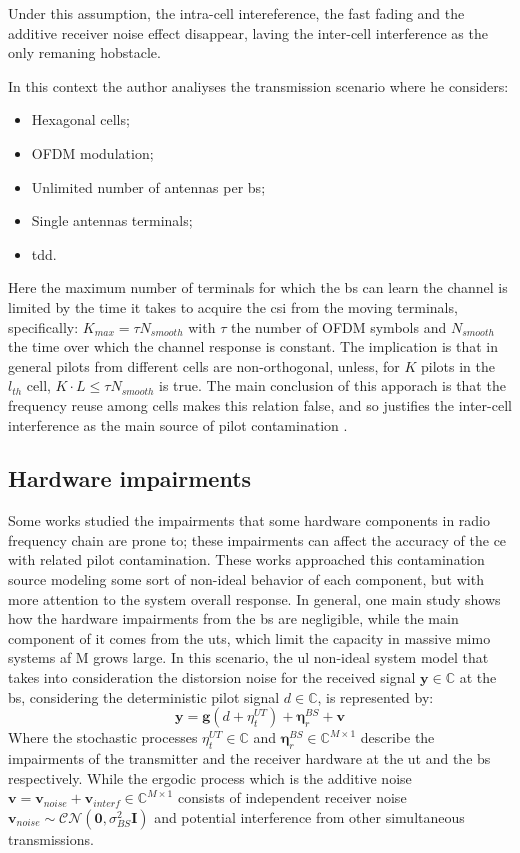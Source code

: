 \documentclass[11pt]{book}
\begin{document}
Under this assumption, the intra-cell intereference, the fast fading and the additive receiver noise effect disappear, laving the inter-cell interference as the only remaning hobstacle.

In this context the author analiyses the transmission scenario where he considers:
\begin{itemize}
  \item Hexagonal cells;
  \item OFDM modulation;
  \item Unlimited number of antennas per \gls{bs};
  \item Single antennas terminals;
  \item \gls{tdd}.
\end{itemize}
Here the maximum number of terminals for which the \gls{bs} can learn the channel is limited by the time it takes to acquire the \gls{csi} from the moving terminals, specifically: $K_{max} = \tau N_{smooth}$ with $\tau$ the number of OFDM symbols and $N_{smooth}$ the time over which the channel response is constant. The implication is that in general pilots from different cells are non-orthogonal, unless, for $K$ pilots in the $l_{th}$ cell, $K\cdot L \leq \tau N_{smooth}$ is true. The main conclusion of this apporach is that the frequency reuse among cells makes this relation false, and so justifies the inter-cell interference as the main source of pilot contamination \cite{Marzetta2010}.
\subsection{Hardware impairments}
Some works studied the impairments that some hardware components in radio frequency chain are prone to; these impairments can affect the accuracy of the \gls{ce} with related pilot contamination. These works approached this contamination source modeling some sort of non-ideal behavior of each component, but with more attention to the system overall response. In general, one main study \cite{Bjornson2014} shows how the hardware impairments from the \gls{bs} are negligible, while the main component of it comes from the \gls{ut}s, which limit the capacity in massive \gls{mimo} systems af M grows large. In this scenario, the \gls{ul} non-ideal system model that takes into consideration the distorsion noise for the received signal $\textbf{y} \in \mathbb{C}$ at the \gls{bs}, considering the deterministic pilot signal $d \in \mathbb{C}$, is represented by:
\begin{equation}
  \textbf{y} = \textbf{g}(d + {\eta}_t^{UT}) + \mathbf{\eta}_r^{BS} + \textbf{v}
\end{equation}
Where the stochastic processes $\eta_t^{UT} \in \mathbb{C}$ and $\mathbf{\eta}_r^{BS} \in \mathbb{C}^{M\times 1}$ describe the impairments of the transmitter and the receiver hardware at the \gls{ut} and the \gls{bs} respectively. While the ergodic process which is the additive noise $\textbf{v} = \textbf{v}_{noise} + \textbf{v}_{interf} \in \mathbb{C}^{M\times 1}$ consists of independent receiver noise $\textbf{v}_{noise} \sim \mathcal{CN}(\textbf{0},\sigma_{BS}^2\textbf{I})$ and potential interference from other simultaneous transmissions.
\end{document}
